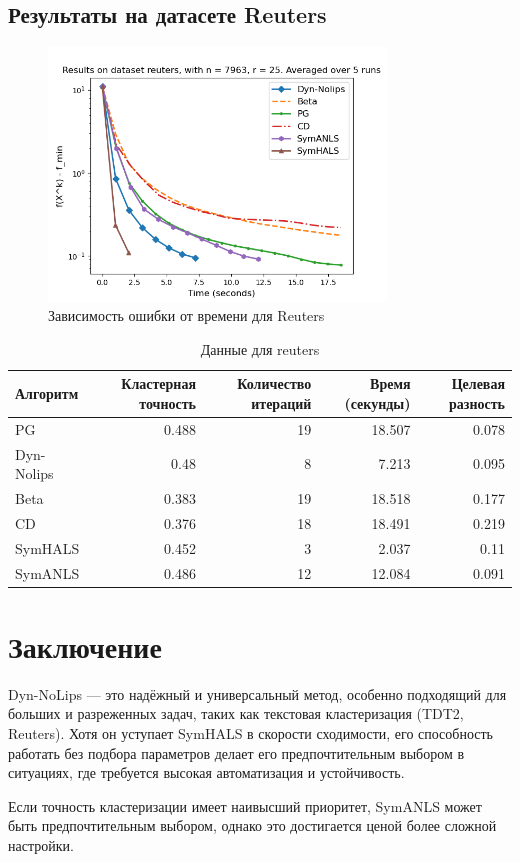 \documentclass[a4paper,11pt]{article}
\begin{document}
\subsection{Результаты на датасете Reuters}
\begin{figure}[h!]
    \centering \includegraphics[width=0.8\textwidth]{my_plot_reuters.png}
    \caption{Зависимость ошибки от времени для Reuters}
    \label{fig:reuters}
\end{figure}
\begin{table}[h!]
    \centering
    \caption{Данные для reuters}
    \label{tab:clustering_accuracy_reuters}
    \begin{tabular}{|l|r|r|r|r|}
        \hline
        Алгоритм & Кластерная точность & Количество итераций & Время (секунды) & Целевая разность \\
        \hline
        PG & 0.488 & 19 & 18.507 & 0.078 \\
        Dyn-Nolips & 0.48 & 8 & 7.213 & 0.095 \\
        Beta & 0.383 & 19 & 18.518 & 0.177 \\
        CD & 0.376 & 18 & 18.491 & 0.219 \\
        SymHALS & 0.452 & 3 & 2.037 & 0.11 \\
        SymANLS & 0.486 & 12 & 12.084 & 0.091 \\
        \hline
    \end{tabular}
\end{table}

\section{Заключение}
Dyn-NoLips — это надёжный и универсальный метод, особенно подходящий для больших и разреженных задач, таких как текстовая кластеризация (TDT2, Reuters). Хотя он уступает SymHALS в скорости сходимости, его способность работать без подбора параметров делает его предпочтительным выбором в ситуациях, где требуется высокая автоматизация и устойчивость.

Если точность кластеризации имеет наивысший приоритет, SymANLS может быть предпочтительным выбором, однако это достигается ценой более сложной настройки.
\end{document}
